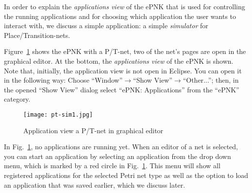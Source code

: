 In order to explain the \emph{applications view}%
of the ePNK that is used for controlling the running applications and for
choosing which application the user wants to interact with, we discuss a simple
application: a simple \emph{simulator} for Place/Transition-nets.%

Figure~\ref{fig:user:pt-sim1} shows the ePNK with a P/T-net, two of the net's
pages are open in the graphical editor. At the bottom, the \emph{applications
view} of the ePNK is shown. Note that, initially, the application view is not
open in Eclipse. You can open it in the following way: Choose
``Window''$\rightarrow$``Show View''$\rightarrow$``Other...''; then, in the opened
``Show View'' dialog select ``ePNK: Applications'' from the ``ePNK'' category.%

\begin{figure}[hbt!!]
  \centerline{\texttt{[image: pt-sim1.jpg]}}
  \caption{Application view a P/T-net in graphical editor}
  \label{fig:user:pt-sim1}
\end{figure}

In Fig.~\ref{fig:user:pt-sim1}, no applications are running yet. When an
editor of a net is selected, you can start an application by selecting
an application from the drop down menu, which is marked by a red circle 
in Fig.~\ref{fig:user:pt-sim1}. This menu will show all registered applications
for the selected Petri net type as well as the option to load an application
that was saved earlier, which we discuss later.

